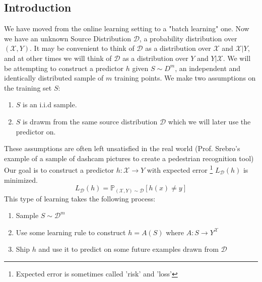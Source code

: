 \documentclass{article}
\newcommand{\p}{\mathbb{P}}
\newcommand{\D}{\mathcal{D}}
\newcommand{\X}{\mathcal{X}}
\begin{document}


\subsection{Introduction}
  We have moved from the online learning setting to a "batch learning" one. Now
  we have an unknown Source Distribution $\D$, a probability distribution over
  $(\X, Y)$.
  It may be convenient to think of $\D$ as a distribution over $\X$ and $\X |
  Y$, and at other times we will think of $\D$ as a distribution over $Y$ and
  $Y | \X$.
  We will be attempting to construct a predictor $h$ given $S \sim D^m$, an
  independent and identically distributed sample of $m$ training points.
  We make two assumptions on the training set $S$:
  \begin{enumerate}
    \item $S$ is an i.i.d sample.
    \item $S$ is drawm from the same source distribution $\D$ which we will
    later use the predictor on.
  \end{enumerate}
  These assumptions are often left unsatisfied in the real world (Prof.
  Srebro's example of a sample of dashcam pictures to create a pedestrian
  recognition tool)
 Our goal is to construct a predictor $h: \X \to Y$ with expected error
 \footnote{Expected error is sometimes called 'risk' and 'loss'}
  $L_\D (h)$ is minimized.
  \begin{equation}\label{expectederror}
    L_\D(h) = \p_{(\X, Y) \sim \D}\left[ h(x) \neq y \right]
  \end{equation}
  This type of learning takes the following process:
  \begin{enumerate}
    \item Sample $S \sim \D^m$
    \item Use some learning rule to construct $h = A(S)$ where $A: S \to Y^\X$
    \item Ship $h$ and use it to predict on some future examples drawn from
    $\D$
  \end{enumerate}
\end{document}
